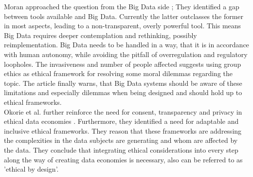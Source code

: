 \documentclass[english, 12pt, a4paper, sci, utf8, a-2b, online]{aaltothesis}
\theoremstyle{change}
\theoremstyle{theoremstyle}
\begin{document}
Moran approached the question from the Big Data side \cite{moran2022towards}; They identified a gap between tools available and Big Data. Currently the latter outclasses the former in most aspects, leading to a non-transparent, overly powerful tool. This means Big Data requires deeper contemplation and rethinking, possibly reimplementation. Big Data needs to be handled in a way, that it is in accordance with human autonomy, while avoiding the pitfall of overregulation and regulatory loopholes. The invasiveness and number of people affected suggests using group ethics as ethical framework for resolving some moral dilemmas regarding the topic. The article finally warns, that Big Data systems should be aware of these limitations and especially dilemmas when being designed and should hold up to ethical frameworks.\\

Okorie et al. further reinforce the need for consent, transparency and privacy in ethical data economies \cite{okorie2024ethical}. Furthermore, they identified a need for adaptable and inclusive ethical frameworks. They reason that these frameworks are addressing the complexities in the data subjects are generating and whom are affected by the data. They conclude that integrating ethical considerations into every step along the way of creating data economies is necessary, also can be referred to as 'ethical by design'.\\
\end{document}
